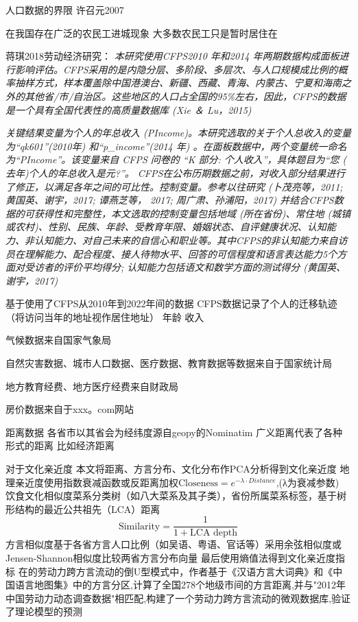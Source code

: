 \documentclass[a4paper,10pt]{article}
\begin{document}
人口数据的界限
许召元2007

在我国存在广泛的农民工进城现象 大多数农民工只是暂时居住在


蒋琪2018劳动经济研究：
\textit{本研究使用CFPS2010 年和2014 年两期数据构成面板进行影响评估。CFPS采用的是内隐分层、多阶段、多层次、与人口规模成比例的概率抽样方式，样本覆盖除中国港澳台、新疆、西藏、青海、内蒙古、宁夏和海南之外的其他省/市/自治区。这些地区的人口占全国的95\%左右，因此，CFPS的数据是一个具有全国代表性的高质量数据库 (Xie ＆ Lu，2015)}

\textit{关键结果变量为个人的年总收入 (PIncome)。本研究选取的关于个人总收入的变量为“qk601”(2010年) 和“p\_income”(2014 年) 。在面板数据中，两个变量统一命名为“PIncome”。该变量来自 CFPS 问卷的 “K 部分: 个人收入”，具体题目为“您 ( 去年)个人的年总收入是元?”。
CFPS在公布历期数据之前，对收入部分结果进行了修正，以满足各年之间的可比性。控制变量。参考以往研究 (卜茂亮等，2011; 黄国英、谢宇，2017; 谭燕芝等， 2017; 周广肃、孙浦阳，2017) 并结合CFPS数据的可获得性和完整性，本文选取的控制变量包括地域 (所在省份)、常住地 (城镇或农村)、性别、民族、年龄、受教育年限、婚姻状态、自评健康状况、认知能力、非认知能力、对自己未来的自信心和职业等。其中CFPS的非认知能力来自访员在理解能力、配合程度、接人待物水平、回答的可信程度和语言表达能力5个方面对受访者的评价平均得分; 认知能力包括语文和数学方面的测试得分 (黄国英、谢宇，2017)}


基于使用了CFPS从2010年到2022年间的数据
CFPS数据记录了个人的迁移轨迹（将访问当年的地址视作居住地址）
年龄
收入

气候数据来自国家气象局

自然灾害数据、城市人口数据、医疗数据、教育数据等数据来自于国家统计局

地方教育经费、地方医疗经费来自财政局

房价数据来自于xxx。com网站

距离数据
各省市以其省会为经纬度源自geopy的Nominatim
广义距离代表了各种形式的距离 比如经济距离

对于文化亲近度
本文将距离、方言分布、文化分布作PCA分析得到文化亲近度
地理亲近度使用指数衰减函数或反距离加权$\text{Closeness}=e^ {-\lambda \cdot Distance}$,(λ为衰减参数)
饮食文化相似度菜系分类树（如八大菜系及其子类），省份所属菜系标签，基于树形结构的最近公共祖先（LCA）距离
\begin{equation}
  \text{Similarity}=\frac{1}{1+\text{LCA depth}}
\end{equation}
方言相似度基于各省方言人口比例（如吴语、粤语、官话等）采用余弦相似度或Jensen-Shannon相似度比较两省方言分布向量
最后使用熵值法得到文化亲近度指标
在\cite{LiuYuYunLaoDongLiKuaFangYanLiuDongDeDaoUXingMoShi2015}的劳动力跨方言流动的倒U型模式中，作者基于《汉语方言大词典》和《中国语言地图集》中的方言分区,计算了全国278个地级市间的方言距离,并与"2012年中国劳动力动态调查数据"相匹配,构建了一个劳动力跨方言流动的微观数据库,验证了理论模型的预测
\end{document}

